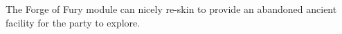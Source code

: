 The Forge of Fury module can nicely re-skin to provide an abandoned ancient facility for the party to explore.
